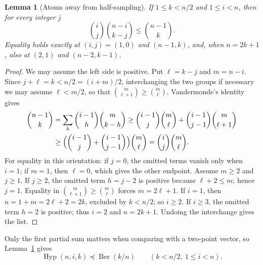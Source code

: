 \documentclass[11pt]{article}
\newtheorem{lemma}[theorem]{Lemma}
\theoremstyle{remark}
\newcommand{\Hyp}{\operatorname{Hyp}}
\newcommand{\Ber}{\operatorname{Ber}}
\begin{document}
\begin{lemma}[Atoms away from half-sampling]\label{lem:atom}
If \(1\le k<n/2\) and \(1\le i<n\), then for every integer \(j\)
\[
 \binom ij\binom{n-i}{k-j}\le\binom{n-1}{k}.
\]
Equality holds exactly at \((i,j)=(1,0)\) and \((n-1,k)\), and, when
\(n=2k+1\), also at \((2,1)\) and \((n-2,k-1)\).
\end{lemma}
\begin{proof}
We may assume the left side is positive. Put \(\ell=k-j\) and \(m=n-i\). Since
\(j+\ell=k<n/2=(i+m)/2\), interchanging the two groups if necessary we may
assume \(\ell<m/2\), so that \(\binom m{\ell+1}\ge\binom m\ell\). Vandermonde's
identity gives
\begin{align*}
 \binom{n-1}{k}
 &=\sum_h\binom{i-1}{h}\binom m{k-h}
 \ge\binom{i-1}{j}\binom m\ell+\binom{i-1}{j-1}\binom m{\ell+1}\\
 &\ge\Bigl(\binom{i-1}{j}+\binom{i-1}{j-1}\Bigr)\binom m\ell
 =\binom ij\binom m\ell .
\end{align*}
For equality in this orientation: if \(j=0\), the omitted terms vanish only
when \(i=1\); if \(m=1\), then \(\ell=0\), which gives the other endpoint.
Assume \(m\ge2\) and \(j\ge1\). If \(j\ge2\), the omitted term \(h=j-2\) is
positive because \(\ell+2\le m\); hence \(j=1\). Equality in
\(\binom m{\ell+1}\ge\binom m\ell\) forces \(m=2\ell+1\). If \(i=1\), then
\(n=1+m=2\ell+2=2k\), excluded by \(k<n/2\); so \(i\ge2\). If \(i\ge3\), the
omitted term \(h=2\) is positive; thus \(i=2\) and \(n=2k+1\). Undoing the
interchange gives the list.
\end{proof}

Only the first partial sum matters when comparing with a two-point vector, so
Lemma~\ref{lem:atom} gives
\begin{equation}\label{eq:unbalancedmaj}
 \Hyp(n,i,k)\preceq\Ber(k/n)\qquad(k<n/2,\ 1\le i<n).
\end{equation}
\end{document}
